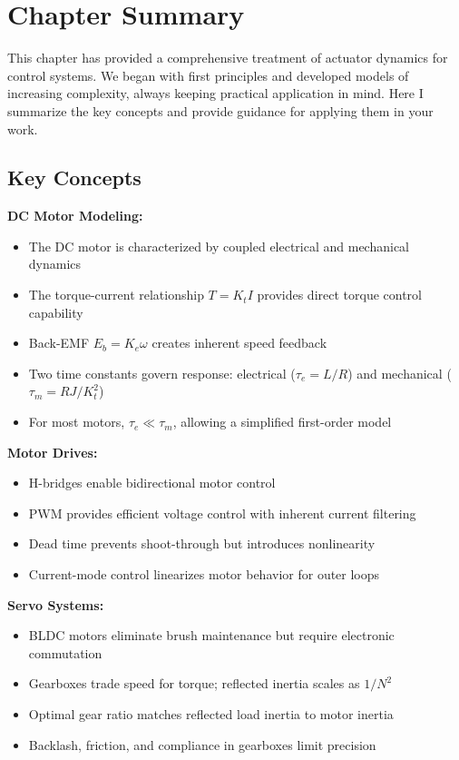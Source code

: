 \section{Chapter Summary}
\label{sec:actuator_summary}

This chapter has provided a comprehensive treatment of actuator dynamics for control systems. We began with first principles and developed models of increasing complexity, always keeping practical application in mind. Here I summarize the key concepts and provide guidance for applying them in your work.

\subsection{Key Concepts}

\textbf{DC Motor Modeling:}
\begin{itemize}
    \item The DC motor is characterized by coupled electrical and mechanical dynamics
    \item The torque-current relationship $T = K_t I$ provides direct torque control capability
    \item Back-EMF $E_b = K_e \omega$ creates inherent speed feedback
    \item Two time constants govern response: electrical ($\tau_e = L/R$) and mechanical ($\tau_m = RJ/K_t^2$)
    \item For most motors, $\tau_e \ll \tau_m$, allowing a simplified first-order model
\end{itemize}

\textbf{Motor Drives:}
\begin{itemize}
    \item H-bridges enable bidirectional motor control
    \item PWM provides efficient voltage control with inherent current filtering
    \item Dead time prevents shoot-through but introduces nonlinearity
    \item Current-mode control linearizes motor behavior for outer loops
\end{itemize}

\textbf{Servo Systems:}
\begin{itemize}
    \item BLDC motors eliminate brush maintenance but require electronic commutation
    \item Gearboxes trade speed for torque; reflected inertia scales as $1/N^2$
    \item Optimal gear ratio matches reflected load inertia to motor inertia
    \item Backlash, friction, and compliance in gearboxes limit precision
\end{itemize}

